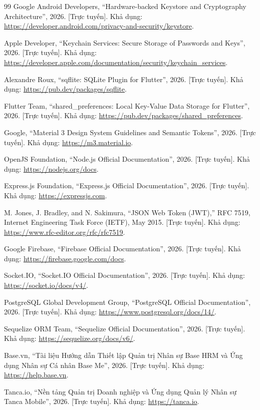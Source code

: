 \begin{thebibliography}{99}
    Google Android Developers, ``Hardware-backed Keystore and Cryptography Architecture'', 2026. [Trực tuyến]. Khả dụng:  \url{https://developer.android.com/privacy-and-security/keystore}.

    Apple Developer, ``Keychain Services: Secure Storage of Passwords and Keys'', 2026. [Trực tuyến]. Khả dụng:  \url{https://developer.apple.com/documentation/security/keychain_services}.

    Alexandre Roux, ``sqflite: SQLite Plugin for Flutter'', 2026. [Trực tuyến]. Khả dụng:  \url{https://pub.dev/packages/sqflite}.

    Flutter Team, ``shared\_preferences: Local Key-Value Data Storage for Flutter'', 2026. [Trực tuyến]. Khả dụng:  \url{https://pub.dev/packages/shared_preferences}.

    Google, ``Material 3 Design System Guidelines and Semantic Tokens'', 2026. [Trực tuyến]. Khả dụng:  \url{https://m3.material.io}.

    OpenJS Foundation, ``Node.js Official Documentation'', 2026. [Trực tuyến]. Khả dụng:  \url{https://nodejs.org/docs}.

    Express.js Foundation, ``Express.js Official Documentation'', 2026. [Trực tuyến]. Khả dụng:  \url{https://expressjs.com}.

    M. Jones, J. Bradley, and N. Sakimura, ``JSON Web Token (JWT),'' RFC 7519, Internet Engineering Task Force (IETF), May 2015. [Trực tuyến]. Khả dụng:  \url{https://www.rfc-editor.org/rfc/rfc7519}.

    Google Firebase, ``Firebase Official Documentation'', 2026. [Trực tuyến]. Khả dụng:  \url{https://firebase.google.com/docs}.

    Socket.IO, ``Socket.IO Official Documentation'', 2026. [Trực tuyến]. Khả dụng:  \url{https://socket.io/docs/v4/}.

    PostgreSQL Global Development Group, ``PostgreSQL Official Documentation'', 2026. [Trực tuyến]. Khả dụng:  \url{https://www.postgresql.org/docs/14/}.

    Sequelize ORM Team, ``Sequelize Official Documentation'', 2026. [Trực tuyến]. Khả dụng:  \url{https://sequelize.org/docs/v6/}.

    Base.vn, ``Tài liệu Hướng dẫn Thiết lập Quản trị Nhân sự Base HRM và Ứng dụng Nhân sự Cá nhân Base Me'', 2026. [Trực tuyến]. Khả dụng:  \url{https://help.base.vn}.

    Tanca.io, ``Nền tảng Quản trị Doanh nghiệp và Ứng dụng Quản lý Nhân sự Tanca Mobile'', 2026. [Trực tuyến]. Khả dụng:  \url{https://tanca.io}.

\end{thebibliography}
